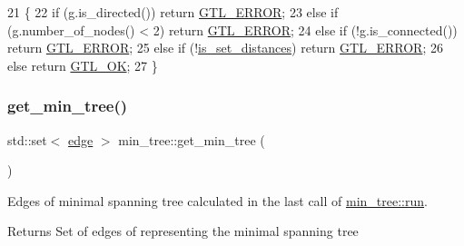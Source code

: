 \begin{DoxyCode}
21                              \{ 
22     \textcolor{keywordflow}{if} (\mbox{\hyperlink{rings_8cpp_aa9df5aa3976a89a96a5f1c7611d42938}{g}}.is\_directed()) \textcolor{keywordflow}{return} \mbox{\hyperlink{classalgorithm_af1a0078e153aa99c24f9bdf0d97f6710a6fcf574690bbd6cf710837a169510dd7}{GTL\_ERROR}};
23     \textcolor{keywordflow}{else} \textcolor{keywordflow}{if} (\mbox{\hyperlink{rings_8cpp_aa9df5aa3976a89a96a5f1c7611d42938}{g}}.number\_of\_nodes() < 2) \textcolor{keywordflow}{return} \mbox{\hyperlink{classalgorithm_af1a0078e153aa99c24f9bdf0d97f6710a6fcf574690bbd6cf710837a169510dd7}{GTL\_ERROR}};
24     \textcolor{keywordflow}{else} \textcolor{keywordflow}{if} (!\mbox{\hyperlink{rings_8cpp_aa9df5aa3976a89a96a5f1c7611d42938}{g}}.is\_connected()) \textcolor{keywordflow}{return} \mbox{\hyperlink{classalgorithm_af1a0078e153aa99c24f9bdf0d97f6710a6fcf574690bbd6cf710837a169510dd7}{GTL\_ERROR}};
25     \textcolor{keywordflow}{else} \textcolor{keywordflow}{if} (!\mbox{\hyperlink{classmin__tree_a7c2ec16bd1799571bc057630262a3a03}{is\_set\_distances}}) \textcolor{keywordflow}{return} \mbox{\hyperlink{classalgorithm_af1a0078e153aa99c24f9bdf0d97f6710a6fcf574690bbd6cf710837a169510dd7}{GTL\_ERROR}};
26     \textcolor{keywordflow}{else} \textcolor{keywordflow}{return} \mbox{\hyperlink{classalgorithm_af1a0078e153aa99c24f9bdf0d97f6710a5114c20e4a96a76b5de9f28bf15e282b}{GTL\_OK}};
27 \}
\end{DoxyCode}
\mbox{\label{classmin__tree_a8491dfab8dc24f0177dec5207fb3d2e1}} 
\subsubsection{\texorpdfstring{get\+\_\+min\+\_\+tree()}{get\_min\_tree()}}
{\footnotesize\ttfamily std\+::set$<$ \mbox{\hyperlink{classedge}{edge}} $>$ min\+\_\+tree\+::get\+\_\+min\+\_\+tree (\begin{DoxyParamCaption}{ }\end{DoxyParamCaption})}



Edges of minimal spanning tree calculated in the last call of \mbox{\hyperlink{classmin__tree_ac025e8dad0db7a6a1e0e7b476b547802}{min\+\_\+tree\+::run}}. 

\begin{DoxyReturn}{Returns}
Set of edges of representing the minimal spanning tree 
\end{DoxyReturn}


